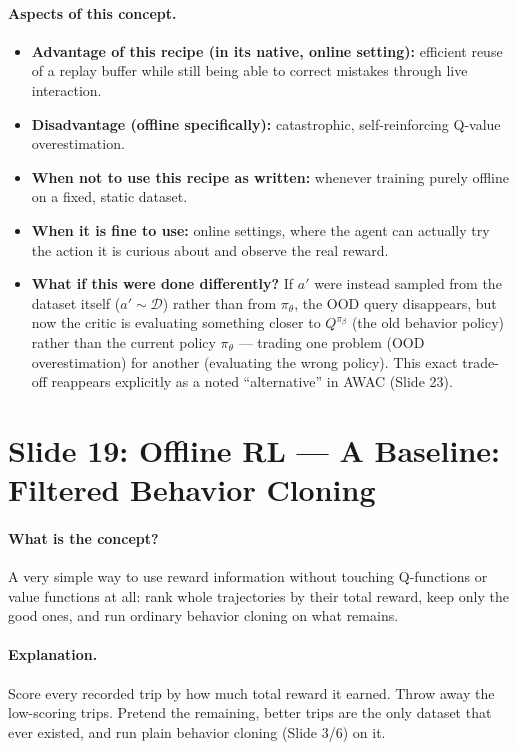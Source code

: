 \documentclass[11pt]{article}
\begin{document}
\paragraph{Aspects of this concept.}
\begin{itemize}
\item \textbf{Advantage of this recipe (in its native, online setting):} efficient reuse
of a replay buffer while still being able to correct mistakes through live interaction.
\item \textbf{Disadvantage (offline specifically):} catastrophic, self-reinforcing
Q-value overestimation.
\item \textbf{When not to use this recipe as written:} whenever training purely offline
on a fixed, static dataset.
\item \textbf{When it is fine to use:} online settings, where the agent can actually try
the action it is curious about and observe the real reward.
\item \textbf{What if this were done differently?} If $a'$ were instead sampled from the
dataset itself ($a'\sim\mathcal{D}$) rather than from $\pi_\theta$, the OOD query
disappears, but now the critic is evaluating something closer to $Q^{\pi_\beta}$ (the
old behavior policy) rather than the current policy $\pi_\theta$ --- trading one problem
(OOD overestimation) for another (evaluating the wrong policy). This exact trade-off
reappears explicitly as a noted ``alternative'' in AWAC (Slide 23).
\end{itemize}

\section{Slide 19: Offline RL --- A Baseline: Filtered Behavior Cloning}

\paragraph{What is the concept?}
A very simple way to use reward information without touching Q-functions or value
functions at all: rank whole trajectories by their total reward, keep only the good
ones, and run ordinary behavior cloning on what remains.

\paragraph{Explanation.}
Score every recorded trip by how much total reward it earned. Throw away the low-scoring
trips. Pretend the remaining, better trips are the only dataset that ever existed, and
run plain behavior cloning (Slide 3/6) on it.
\end{document}
